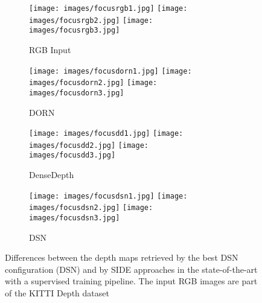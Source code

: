 \documentclass[5p]{elsarticle}
\begin{document}
\begin{figure*}[t!]
     \centering
     \begin{subfigure}[t]{0.2\textwidth}
         \centering
         \caption{RGB Input}
         \texttt{[image: images/focusrgb1.jpg]}
         \hspace{1em}
         \texttt{[image: images/focusrgb2.jpg]}
         \hspace{1em}
         \texttt{[image: images/focusrgb3.jpg]}
         \label{kittisub1:rgb}
     \end{subfigure}
     \begin{subfigure}[t]{0.2\textwidth}
         \centering
         \caption{DORN \cite{fu2018deep}}
         \texttt{[image: images/focusdorn1.jpg]}
         \hspace{1em}
         \texttt{[image: images/focusdorn2.jpg]}
         \hspace{1em}
         \texttt{[image: images/focusdorn3.jpg]}
         \label{kittisub1:dorn}
     \end{subfigure}
          \begin{subfigure}[t]{0.2\textwidth}
         \centering
         \caption{DenseDepth \cite{alhashim2018high}}
         \texttt{[image: images/focusdd1.jpg]}
         \hspace{1em}
         \texttt{[image: images/focusdd2.jpg]}
         \hspace{1em}
         \texttt{[image: images/focusdd3.jpg]}
         \label{kittisub1:densed}
     \end{subfigure}
          \begin{subfigure}[t]{0.2\textwidth}
         \centering
         \caption{DSN}
         \texttt{[image: images/focusdsn1.jpg]}
         \hspace{1em}
         \texttt{[image: images/focusdsn2.jpg]}
         \hspace{1em}
         \texttt{[image: images/focusdsn3.jpg]}
         \label{kittisub1:dsn}
     \end{subfigure}
     \caption{Differences between the depth maps retrieved by the best DSN configuration (DSN) and by SIDE approaches in the state-of-the-art with a supervised training pipeline. The input RGB images are part of the KITTI Depth dataset \cite{uhrig2017sparsity}}
     \label{kittisub1:all}
\end{figure*}
\end{document}
